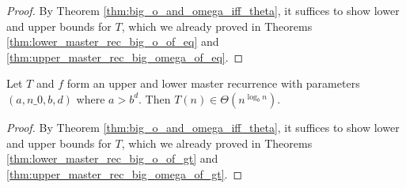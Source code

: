 \begin{proof}
    \leanok
    By Theorem \ref{thm:big_o_and_omega_iff_theta}, it suffices to show
    lower and upper bounds for $T$, which we already proved in Theorems
    \ref{thm:lower_master_rec_big_o_of_eq} and 
    \ref{thm:upper_master_rec_big_omega_of_eq}.
\end{proof}

\begin{corollary}
    \label{thm:master_rec_theta_of_gt}
    \leanok
    Let $T$ and $f$ form an upper and lower master recurrence with parameters 
    $(a, n\_0, b, d)$ where $a > b^d$. Then $T(n) \in \Theta(n^{\log_b{n}})$.
\end{corollary}

\begin{proof}
    \leanok
    By Theorem \ref{thm:big_o_and_omega_iff_theta}, it suffices to show
    lower and upper bounds for $T$, which we already proved in Theorems
    \ref{thm:lower_master_rec_big_o_of_gt} and 
    \ref{thm:upper_master_rec_big_omega_of_gt}.
\end{proof}
